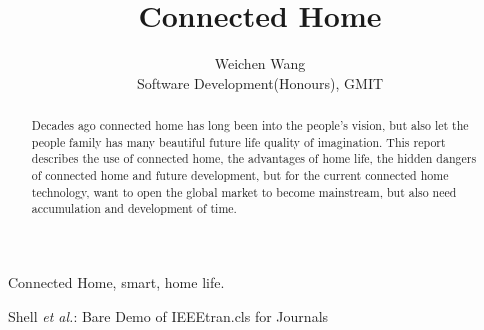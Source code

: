 \documentclass[report]{IEEEtran}
\begin{document}
\title{Connected Home}
\author{Weichen Wang

Software Development(Honours), GMIT}

\maketitle
\begin{abstract}
Decades ago connected home has long been into the people's vision, but also let the people family has many beautiful future life quality of imagination. This report describes the use of connected home, the advantages of home life, the hidden dangers of connected home and future development, but for the current connected home technology, want to open the global market to become mainstream, but also need accumulation and development of time.
\end{abstract}

\begin{IEEEkeywords}
 Connected Home, smart, home life.
\end{IEEEkeywords}
% 
{Shell \MakeLowercase{\textit{et al.}}: Bare Demo of IEEEtran.cls for Journals} 
\end{document}
